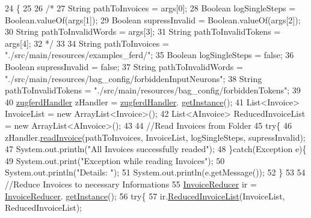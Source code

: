 \begin{DoxyCode}
24                                                               \{
25         
26         \textcolor{comment}{/*}
27 \textcolor{comment}{        String pathToInvoices = args[0];}
28 \textcolor{comment}{        Boolean logSingleSteps = Boolean.valueOf(args[1]);}
29 \textcolor{comment}{        Boolean supressInvalid = Boolean.valueOf(args[2]);}
30 \textcolor{comment}{        String pathToInvalidWords = args[3];}
31 \textcolor{comment}{        String pathToInvalidTokens = args[4];}
32 \textcolor{comment}{        */}
33         
34         String pathToInvoices = \textcolor{stringliteral}{"./src/main/resources/examples\_ferd/"};
35         Boolean logSingleSteps = \textcolor{keyword}{false};
36         Boolean supressInvalid = \textcolor{keyword}{false};
37         String pathToInvalidWords = \textcolor{stringliteral}{"./src/main/resources/bag\_config/forbiddenInputNeurons"};
38         String pathToInvalidTokens = \textcolor{stringliteral}{"./src/main/resources/bag\_config/forbiddenTokens"};
39         
40         \hyperlink{class_import_1_1zugferd_handler}{zugferdHandler} zHandler = \hyperlink{class_import_1_1zugferd_handler}{zugferdHandler}.
      \hyperlink{class_import_1_1zugferd_handler_ad3acd84340c8a5fcb2c01a2636979786}{getInstance}();
41         List<Invoice> InvoiceList = \textcolor{keyword}{new} ArrayList<Invoice>();
42         List<AInvoice> ReducedInvoiceList = \textcolor{keyword}{new} ArrayList<AInvoice>();
43         
44         \textcolor{comment}{//Read Invoices from Folder}
45         \textcolor{keywordflow}{try}\{
46             zHandler.\hyperlink{class_import_1_1zugferd_handler_aea79c23595f003c943e908c95276ecf9}{readInvoice}(pathToInvoices, InvoiceList, logSingleSteps, supressInvalid);
47             System.out.println(\textcolor{stringliteral}{"All Invoices successfully readed"});
48         \}\textcolor{keywordflow}{catch}(Exception e)\{
49             System.out.print(\textcolor{stringliteral}{"Exception while reading Invoices"});
50             System.out.println(\textcolor{stringliteral}{"Details: "});
51             System.out.println(e.getMessage());
52         \}
53         
54         \textcolor{comment}{//Reduce Invoices to necessary Informations}
55         \hyperlink{class_reduced_invoice_1_1_invoice_reducer}{InvoiceReducer} ir = \hyperlink{class_reduced_invoice_1_1_invoice_reducer}{InvoiceReducer}.
      \hyperlink{class_reduced_invoice_1_1_invoice_reducer_ad4fafc7b331a78ef243c3e3ba88803da}{getInstance}();
56         \textcolor{keywordflow}{try}\{
57             ir.\hyperlink{class_reduced_invoice_1_1_invoice_reducer_af064188d62db15e810468e4811af6cc5}{ReducedInvoiceList}(InvoiceList, ReducedInvoiceList);

\end{DoxyCode}
